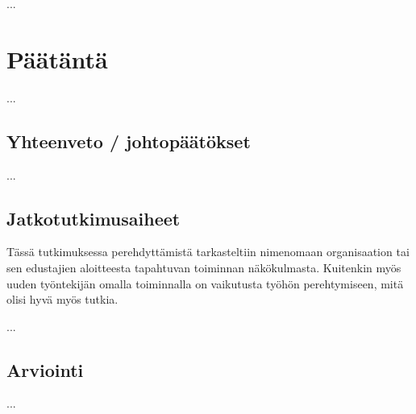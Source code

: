 \documentclass[utf8]{gradu3}
\begin{document}
...
\chapter{Päätäntä}
...
\section{Yhteenveto / johtopäätökset}
...
\section{Jatkotutkimusaiheet}

Tässä tutkimuksessa perehdyttämistä tarkasteltiin nimenomaan organisaation tai sen edustajien aloitteesta tapahtuvan toiminnan näkökulmasta. Kuitenkin myös uuden työntekijän omalla toiminnalla on vaikutusta työhön perehtymiseen, mitä olisi hyvä myös tutkia.

...
\section{Arviointi}
...

\printbibliography
\end{document}
